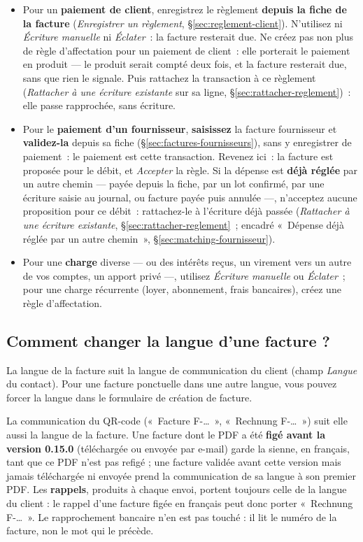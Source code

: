 \documentclass[a4paper,11pt,oneside]{article}
\begin{document}
\begin{itemize}
    \item Pour un \textbf{paiement de client}, enregistrez le règlement \textbf{depuis la fiche de la facture} (\emph{Enregistrer un règlement}, \S\ref{sec:reglement-client}). N'utilisez ni \emph{Écriture manuelle} ni \emph{Éclater}~: la facture resterait due. Ne créez pas non plus de règle d'affectation pour un paiement de client~: elle porterait le paiement en produit --- le produit serait compté deux fois, et la facture resterait due, sans que rien le signale. Puis rattachez la transaction à ce règlement (\emph{Rattacher à une écriture existante} sur sa ligne, \S\ref{sec:rattacher-reglement})~: elle passe rapprochée, sans écriture.
    \item Pour le \textbf{paiement d'un fournisseur}, \textbf{saisissez} la facture fournisseur et \textbf{validez-la} depuis sa fiche (\S\ref{sec:factures-fournisseurs}), sans y enregistrer de paiement~: le paiement est cette transaction. Revenez ici~: la facture est proposée pour le débit, et \emph{Accepter} la règle. Si la dépense est \textbf{déjà réglée} par un autre chemin --- payée depuis la fiche, par un lot confirmé, par une écriture saisie au journal, ou facture payée puis annulée ---, n'acceptez aucune proposition pour ce débit~: rattachez-le à l'écriture déjà passée (\emph{Rattacher à une écriture existante}, \S\ref{sec:rattacher-reglement}~; encadré «~Dépense déjà réglée par un autre chemin~», \S\ref{sec:matching-fournisseur}).
    \item Pour une \textbf{charge} diverse --- ou des intérêts reçus, un virement vers un autre de vos comptes, un apport privé ---, utilisez \emph{Écriture manuelle} ou \emph{Éclater}~; pour une charge récurrente (loyer, abonnement, frais bancaires), créez une règle d'affectation.
\end{itemize}

\subsection{Comment changer la langue d'une facture ?}

La langue de la facture suit la langue de communication du client (champ \emph{Langue} du contact). Pour une facture ponctuelle dans une autre langue, vous pouvez forcer la langue dans le formulaire de création de facture.

La communication du QR-code («~Facture F-…~», «~Rechnung F-…~») suit elle aussi la langue de la facture. Une facture dont le PDF a été \textbf{figé avant la version 0.15.0} (téléchargée ou envoyée par e-mail) garde la sienne, en français, tant que ce PDF n'est pas refigé ; une facture validée avant cette version mais jamais téléchargée ni envoyée prend la communication de sa langue à son premier PDF. Les \textbf{rappels}, produits à chaque envoi, portent toujours celle de la langue du client : le rappel d'une facture figée en français peut donc porter «~Rechnung F-…~». Le rapprochement bancaire n'en est pas touché : il lit le numéro de la facture, non le mot qui le précède.
\end{document}
